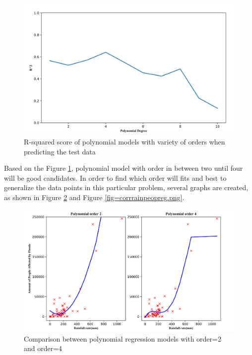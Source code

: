 \begin{figure}
\begin{center}
\graphicspath{ {./Pict/} }
\includegraphics[scale=0.15]{rsquare.png}
\caption{R-squared score of polynomial models with variety of orders when predicting the test data}\label{fig=rsquare.png}
\end{center}
\end{figure}

\noindent 
Based on the Figure \ref{fig=rsquare.png}, polynomial model with order in between two until four will be good candidates. In order to find which order will fits and best to generalize the data points in this particular problem, several graphs are created, as shown in Figure \ref{fig=pol24.png} and Figure \ref{fig=corrrainpeopreg.png}.\\

\begin{figure}
\begin{center}
\graphicspath{ {./Pict/} }
\includegraphics[scale=0.15]{pol24.png}
\caption{Comparison between polynomial regression models with order=2 and order=4}\label{fig=pol24.png}
\end{center}
\end{figure}

